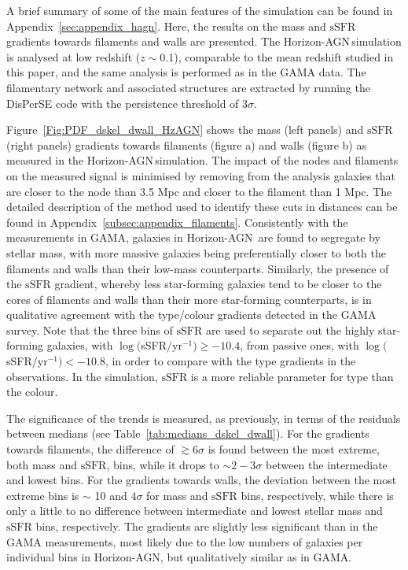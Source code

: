 \documentclass[useAMS,usenatbib]{mnras}
\newcommand{\ssfr}{$\mbox{sSFR}$\xspace}
\newcommand{\hagn}{\mbox{{\sc \small Horizon-AGN}}}
\begin{document}
A brief summary of some of the main features of the simulation can be found in Appendix~\ref{sec:appendix_hagn}.
Here, the results on the mass and \ssfr gradients towards filaments and walls are presented. 
The \hagn\,simulation is analysed at low redshift ($z \sim 0.1$), comparable to the mean redshift studied in this paper, and the same analysis is performed as in the GAMA data. The filamentary network and associated structures are extracted by running the DisPerSE code with the persistence threshold of $3 \sigma$. 


Figure~\ref{Fig:PDF_dskel_dwall_HzAGN} shows the mass (left panels) and \ssfr (right panels) gradients towards filaments (figure a) and walls (figure b) as measured in the \hagn\,simulation. The impact of the nodes and filaments on the measured signal is minimised by removing from the analysis galaxies that are closer to the node than 3.5 Mpc and closer to the filament than 1 Mpc. The detailed description of the method used to identify these cuts in distances can be found in Appendix~\ref{subsec:appendix_filaments}. 
Consistently with the measurements in GAMA, galaxies in \hagn\, are found to segregate by  stellar mass, with more massive galaxies being preferentially  closer to both the filaments and walls than their low-mass counterparts. 
Similarly, the presence of the \ssfr gradient, whereby less star-forming galaxies tend to be closer to the cores of filaments and walls than their more star-forming counterparts, is in qualitative agreement with the type/colour gradients detected in the GAMA survey.   
Note that the three bins of \ssfr are used to separate out the highly star-forming galaxies, with $\log(\ssfr/\mathrm{yr}^{-1}) \geq -10.4$, from passive ones, with $\log (\ssfr/\mathrm{yr}^{-1}) < -10.8$, in order to compare with the type gradients in the observations. In the simulation, \ssfr is a more reliable parameter for type than the colour.

The significance of the trends is measured, as previously, in terms of the residuals between medians (see Table~\ref{tab:medians_dskel_dwall}). 
For the gradients towards filaments, the difference of $\gtrsim 6 \sigma$ is found between the most extreme, both mass and \ssfr, bins, while it drops to $\sim 2-3 \sigma$ between the intermediate and lowest bins.
For the gradients towards walls, the deviation between the most extreme bins is $\sim$ 10 and $4\sigma$ for mass and \ssfr bins, respectively, while there is only a little to no difference between intermediate and lowest stellar mass and \ssfr bins, respectively. The gradients are slightly less significant than in the GAMA measurements, most likely due to the low numbers of galaxies per individual bins in \hagn, but qualitatively similar as in GAMA.
   
\end{document}
